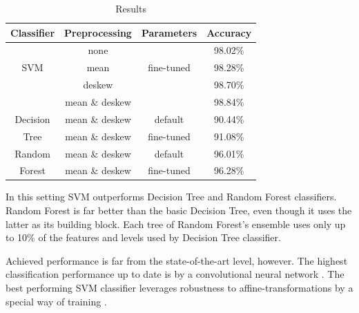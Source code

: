 \documentclass[journal, a4paper]{IEEEtran}
\begin{document}
    \begin{table}[!hbt]
	    \begin{center}
	    \caption{Results}
	    \label{tab:results}
	    \begin{tabular}{c|c|c|c}
		    Classifier & Preprocessing  & Parameters  & Accuracy \\
		    \hline
			      & none             &            & 98.02\% \\
		    SVM       & mean             & fine-tuned & 98.28\% \\
			      & deskew           &            & 98.70\% \\
			      & mean \& deskew   &            & 98.84\% \\
		    \hline
		    Decision & mean \& deskew    & default    & 90.44\% \\
		    Tree     & mean \& deskew    & fine-tuned & 91.08\% \\
		    \hline
		    Random   & mean \& deskew    & default    & 96.01\% \\
		    Forest   & mean \& deskew    & fine-tuned & 96.28\% \\
	    \end{tabular}
	    \end{center}
    \end{table}
	
    In this setting SVM outperforms Decision Tree and Random Forest classifiers. Random Forest is far better than the basic Decision Tree, even though it uses the latter as its building block. Each tree of Random Forest's ensemble uses only up to 10\% of the features and levels used by Decision Tree classifier.
    
    Achieved performance is far from the state-of-the-art level, however. The highest classification performance up to date is by a convolutional neural network \cite{MNIST_Website}. The best performing SVM classifier leverages robustness to affine-transformations by a special way of training \cite{VSVM}.
    
\end{document}

